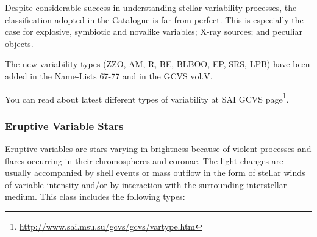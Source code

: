 Despite considerable success in understanding stellar variability
processes, the classification adopted in the Catalogue is far from
perfect. This is especially the case for explosive, symbiotic and
novalike variables; X-ray sources; and peculiar objects.

The new variability types (ZZO, AM, R, BE, BLBOO, EP, SRS, LPB) have been 
added in the Name-Lists 67-77 and in the GCVS vol.V.

You can read about latest different types of variability at SAI GCVS page\footnote{
\url{http://www.sai.msu.su/gcvs/gcvs/vartype.htm}}.

\subsubsection{Eruptive Variable Stars}\label{eruptive-variable-stars}

Eruptive variables are stars varying in brightness because of violent
processes and flares occurring in their chromospheres and coronae. The
light changes are usually accompanied by shell events or mass outflow in
the form of stellar winds of variable intensity and/or by interaction
with the surrounding interstellar medium. This class includes the
following types:

